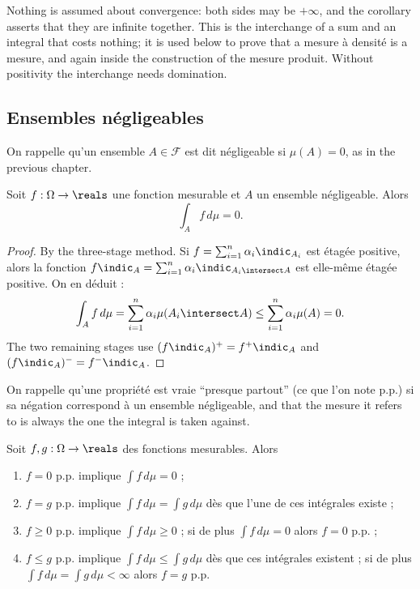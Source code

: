 \begin{remark}
  Nothing is assumed about convergence: both sides may be $+\infty$, and the corollary
  asserts that they are infinite together. This is the interchange of a sum and an
  integral that costs nothing; it is used below to prove that a mesure à densité is a
  mesure, and again inside the construction of the mesure produit. Without
  positivity the interchange needs domination.
\end{remark}

\subsection{Ensembles négligeables}

On rappelle qu'un ensemble $A \in \mathcal{F}$ est dit négligeable si $\mu(A) = 0$,
as in the previous chapter.

\begin{prop}
  Soit $f : \Omega \to \reals$ une fonction mesurable et $A$ un ensemble négligeable.
  Alors
  \[
    \int_{A} f \, d\mu = 0 .
  \]
\end{prop}

\begin{proof}
  By the three-stage method. Si $f = \sum_{i=1}^{n} \alpha_{i} \indic_{A_{i}}$ est
  étagée positive, alors la fonction $f \indic_{A} = \sum_{i=1}^{n} \alpha_{i}
  \indic_{A_{i} \intersect A}$ est elle-même étagée positive. On en déduit :
  \[
    \int_{A} f \, d\mu = \sum_{i=1}^{n} \alpha_{i} \mu(A_{i} \intersect A)
    \leq \sum_{i=1}^{n} \alpha_{i} \mu(A) = 0 .
  \]
  The two remaining stages use $(f \indic_{A})^{+} = f^{+} \indic_{A}$ and $(f
  \indic_{A})^{-} = f^{-} \indic_{A}$.
\end{proof}

On rappelle qu'une propriété est vraie ``presque partout'' (ce que l'on note p.p.) si
sa négation correspond à un ensemble négligeable, and that the mesure it refers to is
always the one the integral is taken against.

\begin{theorem}
  Soit $f, g : \Omega \to \reals$ des fonctions mesurables. Alors
  \begin{enumerate}
    \item $f = 0$ p.p. implique $\int f \, d\mu = 0$ ;
    \item $f = g$ p.p. implique $\int f \, d\mu = \int g \, d\mu$ dès que l'une de
      ces intégrales existe ;
    \item $f \geq 0$ p.p. implique $\int f \, d\mu \geq 0$ ; si de plus $\int f \,
      d\mu = 0$ alors $f = 0$ p.p. ;
    \item $f \leq g$ p.p. implique $\int f \, d\mu \leq \int g \, d\mu$ dès que ces
      intégrales existent ; si de plus $\int f \, d\mu = \int g \, d\mu < \infty$
      alors $f = g$ p.p.
  \end{enumerate}
\end{theorem}

